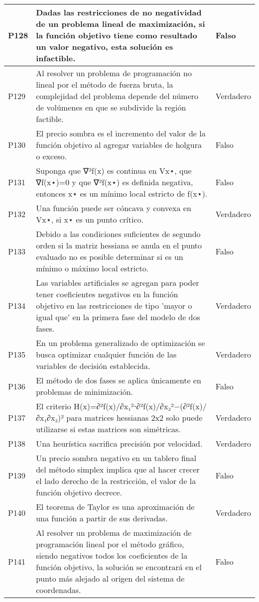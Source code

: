 \documentclass{article}
\begin{document}
\begin{longtable}{|>{\centering\arraybackslash}p{1.5cm}|>{\raggedright\arraybackslash}p{14cm}|>{\centering\arraybackslash}p{2cm}|}
\hline
P128 & Dadas las restricciones de no negatividad de un problema lineal de maximización, si la función objetivo tiene como resultado un valor negativo, esta solución es infactible. & Falso \\
\hline
P129 & Al resolver un problema de programación no lineal por el método de fuerza bruta, la complejidad del problema depende del número de volúmenes en que se subdivide la región factible. & Verdadero \\
\hline
P130 & El precio sombra es el incremento del valor de la función objetivo al agregar variables de holgura o exceso. & Falso \\
\hline
P131 & Suponga que ∇²f(x) es continua en Vx⋆, que ∇f(x⋆)=0 y que ∇²f(x⋆) es definida negativa, entonces x⋆ es un mínimo local estricto de f(x⋆). & Falso \\
\hline
P132 & Una función puede ser cóncava y convexa en Vx⋆, si x⋆ es un punto crítico. & Verdadero \\
\hline
P133 & Debido a las condiciones suficientes de segundo orden si la matriz hessiana se anula en el punto evaluado no es posible determinar si es un mínimo o máximo local estricto. & Falso \\
\hline
P134 & Las variables artificiales se agregan para poder tener coeficientes negativos en la función objetivo en las restricciones de tipo 'mayor o igual que' en la primera fase del modelo de dos fases. & Verdadero \\
\hline
P135 & En un problema generalizado de optimización se busca optimizar cualquier función de las variables de decisión establecida. & Verdadero \\
\hline
P136 & El método de dos fases se aplica únicamente en problemas de minimización. & Falso \\
\hline
P137 & El criterio H(x)=∂²f(x)/∂x₁²⋅∂²f(x)/∂x₂²−(∂²f(x)/∂x₁∂x₂)² para matrices hessianas 2x2 solo puede utilizarse si estas matrices son simétricas. & Verdadero \\
\hline
P138 & Una heurística sacrifica precisión por velocidad. & Verdadero \\
\hline
P139 & Un precio sombra negativo en un tablero final del método simplex implica que al hacer crecer el lado derecho de la restricción, el valor de la función objetivo decrece. & Falso \\
\hline
P140 & El teorema de Taylor es una aproximación de una función a partir de sus derivadas. & Verdadero \\
\hline
P141 & Al resolver un problema de maximización de programación lineal por el método gráfico, siendo negativos todos los coeficientes de la función objetivo, la solución se encontrará en el punto más alejado al origen del sistema de coordenadas. & Falso \\

\end{longtable}
\end{document}
